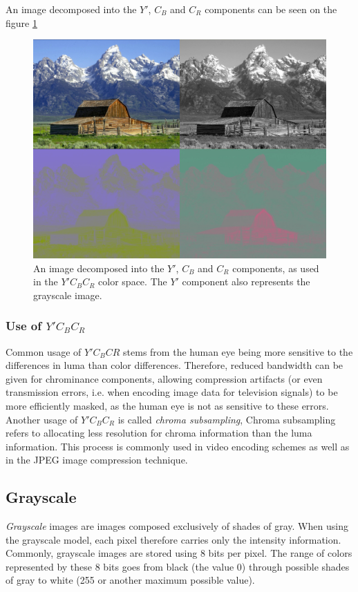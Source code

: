 \documentclass[thesis=M,english]{FITthesis}[2012/10/20]
\begin{document}
An image decomposed into the $Y'$, $C_B$ and $C_R$ components can be seen on the figure
\ref{fig:house-ycbcrdecomp}

\begin{figure}[h]
  \centering
  \includegraphics[scale=0.5]{imgs/houses-decomp-ycbcr}
  \caption{An image decomposed into the $Y'$, $C_B$ and $C_R$ components, as used
           in the $Y'C_BC_R$ color space. The $Y'$ component also represents the
           grayscale image.}
  \label{fig:house-ycbcrdecomp}
\end{figure}

\subsubsection{Use of $Y'C_{B}C_{R}$}
Common usage of $Y'C_{B}C{R}$ stems from the human eye being more sensitive to the
differences in luma than color differences. Therefore, reduced bandwidth can be
given for chrominance components, allowing compression artifacts (or even transmission
errors, i.e. when encoding image data for television signals) to be more efficiently
masked, as the human eye is not as sensitive to these errors.
\\

Another usage of $Y'C_BC_R$ is called \emph{chroma subsampling}, Chroma subsampling
refers to allocating less resolution for chroma information than the luma information.
This process is commonly used in video encoding schemes as well as in the JPEG
image compression technique.\cite{img:chroma-subsample}


\subsection{Grayscale}
\emph{Grayscale} images are images composed exclusively of shades of gray.
When using the grayscale model, each pixel therefore carries only the intensity
information. Commonly, grayscale images are stored using 8 bits per pixel.
The range of colors represented by these 8 bits goes from black (the value 0)
through possible shades of gray to white (255 or another maximum possible value).
\\
\end{document}
